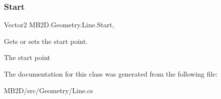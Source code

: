 \subsubsection{\texorpdfstring{Start}{Start}}
{\footnotesize\ttfamily Vector2 M\+B2\+D.\+Geometry.\+Line.\+Start\hspace{0.3cm}{\ttfamily [get]}, {\ttfamily [set]}}



Gets or sets the start point. 

The start point

The documentation for this class was generated from the following file\+:\begin{DoxyCompactItemize}
\item 
M\+B2\+D/src/\+Geometry/Line.\+cs\end{DoxyCompactItemize}
